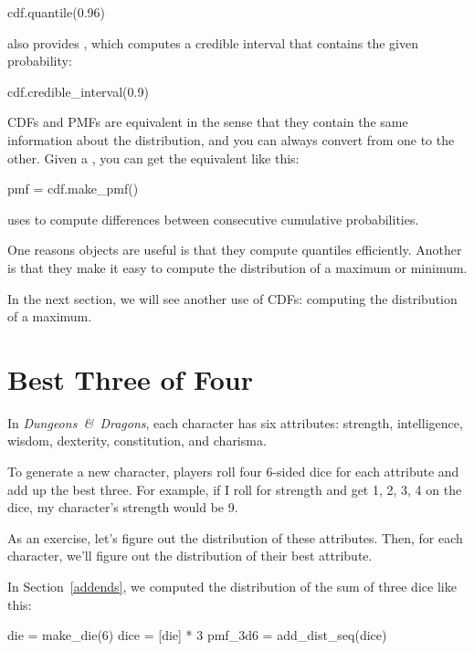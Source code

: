 \documentclass[12pt]{book}
\theoremstyle{exercise}
\begin{document}
\begin{code}
cdf.quantile(0.96)
\end{code}

 also provides , which computes a credible interval that contains the given probability:

\begin{code}
cdf.credible_interval(0.9)
\end{code}

CDFs and PMFs are equivalent in the sense that they contain the
same information about the distribution, and you can always convert
from one to the other.
Given a , you can get the equivalent  like this:

\begin{code}
pmf = cdf.make_pmf()
\end{code}

 uses  to compute differences between consecutive cumulative probabilities.

One reasons  objects are useful is that they compute quantiles efficiently.
Another is that they make it easy to compute the distribution of a maximum or minimum.

In the next section, we will see another use of CDFs: computing the distribution of a maximum.


\section{Best Three of Four}

In {\it Dungeons~\&~Dragons}, each character has six attributes: strength, intelligence, wisdom, dexterity, constitution, and charisma.

To generate a new character, players roll four 6-sided dice for each attribute and add up the best three.
For example, if I roll for strength and get 1, 2, 3, 4 on the dice, my character's strength would be 9.

As an exercise, let's figure out the distribution of these attributes.
Then, for each character, we'll figure out the distribution of their best attribute.

In Section~\ref{addends}, we computed the distribution of the sum of three dice like this:

\begin{code}
die = make_die(6)
dice = [die] * 3
pmf_3d6 = add_dist_seq(dice)
\end{code}
\end{document}
